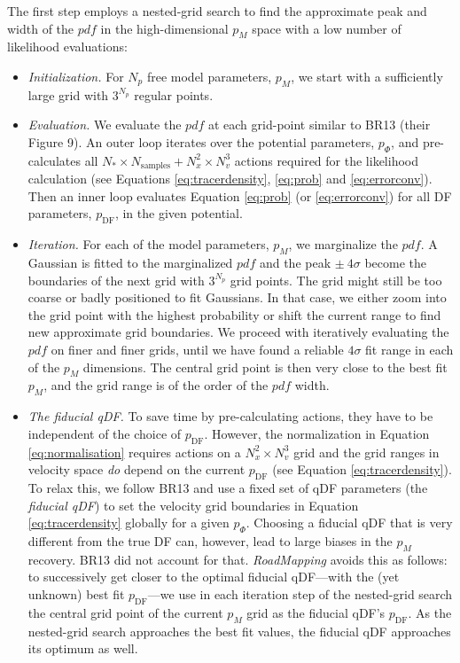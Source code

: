 \documentclass[iop,revtex4,numberedappendix,appendixfloats]{emulateapj}
\newcommand{\pdf}{\ensuremath{pdf}}
\newcommand{\pmodel}{\ensuremath{p_M}}
\newcommand{\RM}{{\sl RoadMapping}}
\begin{document}
The first step employs a nested-grid search to find the approximate peak and width of the \pdf{} in the high-dimensional \pmodel{} space with a low number of likelihood evaluations:

\begin{itemize}
\item \emph{Initialization.} For $N_p$ free model parameters, \pmodel{}, we start with a sufficiently large grid with $3^{N_p}$ regular points.

\item \emph{Evaluation.} We evaluate the \pdf{} at each grid-point similar to BR13 (their Figure 9). An outer loop iterates over the potential parameters, $p_\Phi$, and pre-calculates all $N_* \times N_\text{samples} + N_x^2 \times N_v^3$ actions required for the likelihood calculation (see Equations \eqref{eq:tracerdensity}, \eqref{eq:prob} and \eqref{eq:errorconv}). Then an inner loop evaluates Equation \eqref{eq:prob} (or \eqref{eq:errorconv}) for all DF parameters, $p_\text{DF}$, in the given potential.

\item \emph{Iteration.} For each of the model parameters, \pmodel{}, we marginalize the \pdf{}. A Gaussian is fitted to the marginalized \pdf{} and the peak $\pm ~ 4\sigma$ become the boundaries of the next grid with $3^{N_p}$ grid points. The grid might still be too coarse or badly positioned to fit Gaussians. In that case, we either zoom into the grid point with the highest probability or shift the current range to find new approximate grid boundaries. We proceed with iteratively evaluating the \pdf{} on finer and finer grids, until we have found a reliable $4\sigma$ fit range in each of the \pmodel{} dimensions. The central grid point is then very close to the best fit \pmodel{}, and the grid range is of the order of the \pdf{} width.

\item \emph{The fiducial qDF.} To save time by pre-calculating actions, they have to be independent of the choice of $p_\text{DF}$. However, the normalization in Equation \eqref{eq:normalisation} requires actions on a $N_x^2 \times N_v^3$ grid and the grid ranges in velocity space \emph{do} depend on the current $p_\text{DF}$ (see Equation \eqref{eq:tracerdensity}). To relax this, we follow BR13 and use a fixed set of qDF parameters (the \emph{fiducial qDF}) to set the velocity grid boundaries in Equation \eqref{eq:tracerdensity} globally for a given $p_\Phi$. Choosing a fiducial qDF that is very different from the true DF can, however, lead to large biases in the \pmodel{} recovery. BR13 did not account for that. \RM{} avoids this as follows: to successively get closer to the optimal fiducial qDF---with the (yet unknown) best fit $p_\text{DF}$---we use in each iteration step of the nested-grid search the central grid point of the current \pmodel{} grid as the fiducial qDF's $p_\text{DF}$. As the nested-grid search approaches the best fit values, the fiducial qDF approaches its optimum as well. 


\end{itemize}
\end{document}
